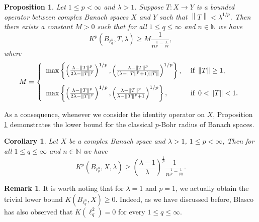 \documentclass[a4paper,12pt]{amsart}
\newtheorem{cor}[equation]{Corollary}
\newtheorem{prop}[equation]{Proposition}
\theoremstyle{definition}
\newtheorem{rem}{Remark}[section]
\newcommand{\norm}[1]{\left\lVert#1\right\rVert}
\begin{document}
 \begin{prop}\label{Pal-Vasu-P5-prop-01}
 	Let $1\leq p<\infty$ and $\lambda >1$. Suppose $T:X\rightarrow Y$ is a bounded operator between complex Banach spaces $X$ and $Y$ such that $\norm{T}<\lambda^{1/p}$. Then there exists a constant $M>0$ such that for all $1\leq q\leq \infty$ and $n\in \mathbb{N}$ we have 
 	\begin{equation*}
 		K^p(B_{\ell^n_q},T,\lambda)\geq M \frac{1}{n^{\frac{1}{p}-\frac{1}{pq}}},
 	\end{equation*}
 	where 
 	$$
 	M=\left\{\begin{array}{ll}
 		\max \left\{\left(\frac{\lambda-\norm{T}^{p}}{2\lambda-\norm{T}^p}\right)^{1/p}, \left(\frac{\lambda-\norm{T}^p}{(\lambda-\norm{T}^p+1)\norm{T}}\right)^{1/p}\right\}, & \mbox{ if  \,$\norm{T}\geq 1$},\\[5mm] 
 		\max \left\{\left(\frac{\lambda-\norm{T}^{p}}{2\lambda-\norm{T}^p}\right)^{1/p}, \left(\frac{\lambda-\norm{T}^p}{\lambda-\norm{T}^p+1}\right)^{1/p}\right\}, & \mbox{ if \,$0<\norm{T}<1$}.
 	\end{array}\right.
 	$$
 \end{prop}
As a consequence, whenever we consider the identity operator on $X$, Proposition \ref{Pal-Vasu-P5-prop-01} demonstrates the lower bound for the classical $p$-Bohr radius of Banach spaces.

\begin{cor}\label{Pal-Vasu-P5-cor-01}
	Let $X$ be a complex Banach space and $\lambda>1$, $1\leq p<\infty$, Then for all $1\leq q\leq \infty$ and $n\in \mathbb{N}$ we have
	\begin{equation*}
		K^p(B_{\ell^n_q},X,\lambda)\geq \left(\frac{\lambda-1}{\lambda}\right)^{\frac{1}{p}}\frac{1}{n^{\frac{1}{p}-\frac{1}{pq}}}.
	\end{equation*}
\end{cor}
\begin{rem}
	It is worth noting that for $\lambda=1$ and $p=1$, we actually obtain the trivial lower bound $K(B_{\ell^n_q},X)\geq 0$. Indeed, as we have discussed before, Blasco \cite[Theorem 1.2]{Blasco-OTAA-2010} has also observed that $K(\ell^2_q)=0$ for every $1\leq q\leq \infty$.
\end{rem}
\end{document}
